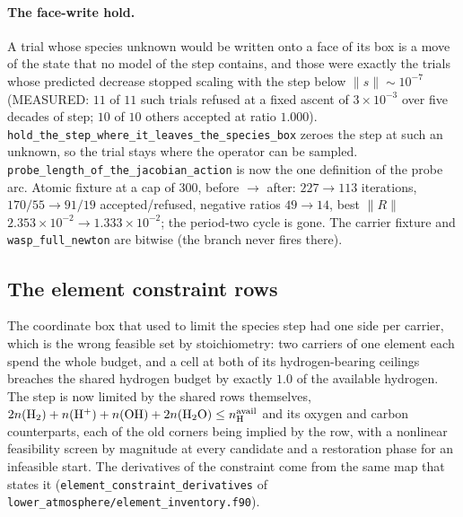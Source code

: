 \documentclass[english,a4paper]{my_memo}
\newcommand{\code}[1]{\texttt{#1}}
\begin{document}
\paragraph{The face-write hold.} A trial whose species unknown would be
written onto a face of its box is a move of the state that no model of the
step contains, and those were exactly the trials whose predicted decrease
stopped scaling with the step below $\|s\| \sim 10^{-7}$ (MEASURED: $11$ of
$11$ such trials refused at a fixed ascent of $3\times10^{-3}$ over five
decades of step; $10$ of $10$ others accepted at ratio $1.000$).
\code{hold\_the\_step\_where\_it\_leaves\_the\_species\_box} zeroes the step
at such an unknown, so the trial stays where the operator can be sampled.
\code{probe\_length\_of\_the\_jacobian\_action} is now the one definition of
the probe arc. Atomic fixture at a cap of $300$, before $\rightarrow$ after:
$227 \rightarrow 113$ iterations, $170/55 \rightarrow 91/19$
accepted/refused, negative ratios $49 \rightarrow 14$, best $\|R\|$
$2.353\times10^{-2} \rightarrow 1.333\times10^{-2}$; the period-two cycle is
gone. The carrier fixture and \code{wasp\_full\_newton} are bitwise (the
branch never fires there).

\subsection{The element constraint rows}
\label{sec:elemrows}

The coordinate box that used to limit the species step had one side per
carrier, which is the wrong feasible set by stoichiometry: two carriers of
one element each spend the whole budget, and a cell at both of its
hydrogen-bearing ceilings breaches the shared hydrogen budget by exactly
$1.0$ of the available hydrogen. The step is now limited by the shared rows
themselves,
$2n({\rm H_2}) + n({\rm H^+}) + n({\rm OH}) + 2n({\rm H_2O}) \le
n_{\rm H}^{\rm avail}$ and its oxygen and carbon counterparts, each of the
old corners being implied by the row, with a nonlinear feasibility screen by
magnitude at every candidate and a restoration phase for an infeasible start.
The derivatives of the constraint come from the same map that states it
(\code{element\_constraint\_derivatives} of
\code{lower\_atmosphere/element\_inventory.f90}).
\end{document}
